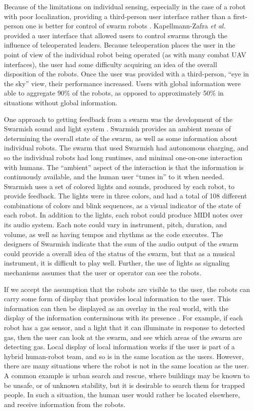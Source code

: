 Because of the limitations on individual sensing, especially in the case of a robot with poor localization, providing a third-person user interface rather than a first-person one is better for control of swarm robots \citep{kapellmann2016human}. 
Kapellmann-Zafra \emph{et al.} provided a user interface that allowed users to control swarms through the influence of teleoperated leaders. 
Because teleoperation places the user in the point of view of the individual robot being operated (as with many combat UAV interfaces), the user had some difficulty acquiring an idea of the overall disposition of the robots. 
Once the user was provided with a third-person, ``eye in the sky'' view, their performance increased. 
Users with global information were able to aggregate 90\% of the robots, as opposed to approximately 50\% in situations without global information. 

One approach to getting feedback from a swarm was the development of the Swarmish sound and light system \citep{mclurkin2006speaking}. 
Swarmish provides an ambient means of determining the overall state of the swarm, as well as some information about individual robots. 
The swarm that used Swarmish had autonomous charging, and so the individual robots had long runtimes, and minimal one-on-one interaction with humans. 
The ``ambient'' aspect of the interaction is that the information is continuously available, and the human user ``tunes in'' to it when needed. 
Swarmish uses a set of colored lights and sounds, produced by each robot, to provide feedback. 
The lights were in three colors, and had a total of 108 different combinations of colors and blink sequences, as a visual indicator of the state of each robot. 
In addition to the lights, each robot could produce MIDI notes over its audio system. 
Each note could vary in instrument, pitch, duration, and volume, as well as having tempos and rhythms as the code executes. 
The designers of Swarmish indicate that the sum of the audio output of the swarm could provide a overall idea of the status of the swarm, but that as a musical instrument, it is difficult to play well. 
Further, the use of lights as signaling mechanisms assumes that the user or operator can see the robots. 

If we accept the assumption that the robots are visible to the user, the robots can carry some form of display that provides local information to the user. 
This information can then be displayed as an overlay in the real world, with the display of the information conterminous with its presence \citep{Daily:2003:WEI:820752.821587}. 
For example, if each robot has a gas sensor, and a light that it can illuminate in response to detected gas, then the user can look at the swarm, and see which areas of the swarm are detecting gas.
Local display of local information works if the user is part of a hybrid human-robot team, and so is in the same location as the users. 
However, there are many situations where the robot is not in the same location as the user. 
A common example is urban search and rescue, where buildings may be known to be unsafe, or of unknown stability, but it is desirable to search them for trapped people. 
In such a situation, the human user would rather be located elsewhere, and receive information from the robots. 

